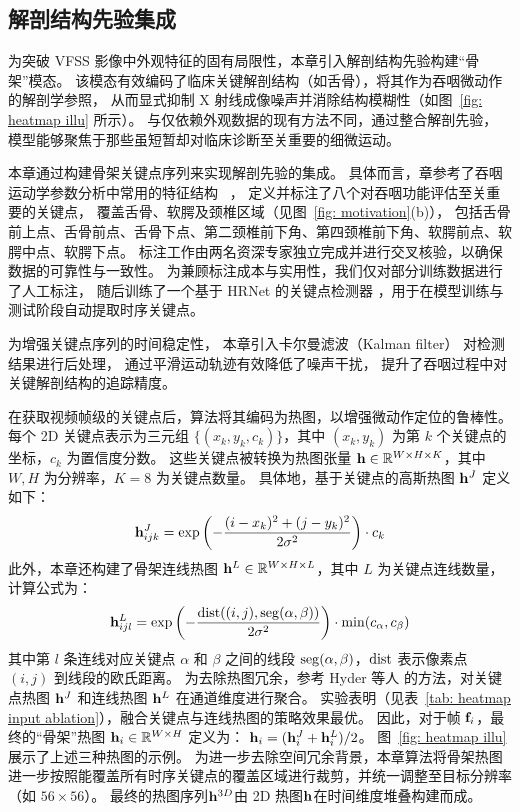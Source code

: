 \subsection{解剖结构先验集成} 

为突破 VFSS 影像中外观特征的固有局限性，本章引入解剖结构先验构建“骨架”模态。
该模态有效编码了临床关键解剖结构（如舌骨），将其作为吞咽微动作的解剖学参照，
从而显式抑制 X 射线成像噪声并消除结构模糊性（如图~\ref{fig: heatmap illu} 所示）。
与仅依赖外观数据的现有方法不同，通过整合解剖先验，
模型能够聚焦于那些虽短暂却对临床诊断至关重要的细微运动。

本章通过构建骨架关键点序列来实现解剖先验的集成。
具体而言，章参考了吞咽运动学参数分析中常用的特征结构
~\cite{zhang2021automatic, hsiao2023deep, goldfield2010premature}，
定义并标注了八个对吞咽功能评估至关重要的关键点，
覆盖舌骨、软腭及颈椎区域（见图~\ref{fig: motivation}(b)），
包括舌骨前上点、舌骨前点、舌骨下点、第二颈椎前下角、第四颈椎前下角、软腭前点、软腭中点、软腭下点。
标注工作由两名资深专家独立完成并进行交叉核验，以确保数据的可靠性与一致性。
为兼顾标注成本与实用性，我们仅对部分训练数据进行了人工标注，
随后训练了一个基于 HRNet 的关键点检测器 \cite{wang2020deep}，用于在模型训练与测试阶段自动提取时序关键点。

为增强关键点序列的时间稳定性，
本章引入卡尔曼滤波（Kalman filter）\cite{kalman1960new} 对检测结果进行后处理，
通过平滑运动轨迹有效降低了噪声干扰，
提升了吞咽过程中对关键解剖结构的追踪精度。

在获取视频帧级的关键点后，算法将其编码为热图，以增强微动作定位的鲁棒性。
每个 2D 关键点表示为三元组 \(\{(x_k, y_k, c_k)\}\)，其中 \((x_k, y_k)\) 为第 \(k\) 个关键点的坐标，\(c_k\) 为置信度分数。
这些关键点被转换为热图张量 \(\mathbf{h} \in \mathbb{R}^{W \times H \times K}\)，其中 \(W, H\) 为分辨率，\(K=8\) 为关键点数量。
具体地，基于关键点的高斯热图 \(\mathbf{h}^J\) 定义如下：
\begin{equation}\label{eq: heatmap_k}
    \mathbf{h}^J_{ijk} = \exp\left(-\frac{(i - x_k)^2 + (j - y_k)^2}{2 \sigma^2}\right) \cdot c_k
\end{equation}
此外，本章还构建了骨架连线热图 \(\mathbf{h}^L \in \mathbb{R}^{W \times H \times L}\)，其中 \(L\) 为关键点连线数量，计算公式为：
\begin{equation}\label{eq: heatmap_l}
\mathbf{h}^L_{ijl} = \exp\left(-\frac{{\rm dist}((i, j), {\rm seg}(\alpha, \beta))}{2 \sigma^2}\right) \cdot \min(c_{\alpha}, c_{\beta})
\end{equation}
其中第 \(l\) 条连线对应关键点 \(\alpha\) 和 \(\beta\) 之间的线段 \({\rm seg}(\alpha, \beta)\)，\({\rm dist}\) 表示像素点 \((i, j)\) 到线段的欧氏距离。
为去除热图冗余，参考 Hyder 等人 \cite{hyder2024action} 的方法，对关键点热图 \(\mathbf{h}^J\) 和连线热图 \(\mathbf{h}^L\) 在通道维度进行聚合。
实验表明（见表~\ref{tab: heatmap input ablation}），融合关键点与连线热图的策略效果最优。
因此，对于帧 \(\mathbf{f}_i\)，最终的“骨架”热图 \(\mathbf{h}_i \in \mathbb{R}^{W \times H}\) 定义为：
\(\mathbf{h}_i = (\mathbf{h}_i^J + \mathbf{h}_i^L)/{2}\)。
图~\ref{fig: heatmap illu} 展示了上述三种热图的示例。
为进一步去除空间冗余背景，本章算法将骨架热图进一步按照能覆盖所有时序关键点的覆盖区域进行裁剪，并统一调整至目标分辨率（如 \(56 \times 56\)）。
最终的热图序列\(\mathbf{h}^{3D}\)由 2D 热图\(\mathbf{h}\)在时间维度堆叠构建而成。

